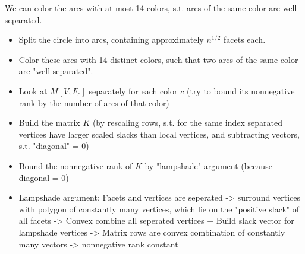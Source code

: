 \begin{lemma}
  We can color the arcs with at most 14 colors, s.t. arcs of the same color are well-separated.
\end{lemma}

\begin{itemize}
  \item Split the circle into arcs, containing approximately $n^{1/2}$ facets each.
  \item Color these arcs with 14 distinct colors, such that two arcs of the same color are "well-separated".
  \item Look at $M[V,F_c]$ separately for each color $c$ (try to bound its nonnegative rank by the number of arcs of that color)
  \item Build the matrix $K$ (by rescaling rows, s.t. for the same index separated vertices have larger scaled slacks than local vertices, and subtracting vectors, s.t. "diagonal" = 0)
  \item Bound the nonnegative rank of $K$ by "lampshade" argument (because diagonal = 0) 
  \item Lampshade argument: Facets and vertices are seperated -> surround vertices with polygon of constantly many vertices, which lie on the "positive slack" of all facets -> Convex combine all seperated vertices + Build slack vector for lampshade vertices -> Matrix rows are convex combination of constantly many vectors -> nonnegative rank constant
\end{itemize}